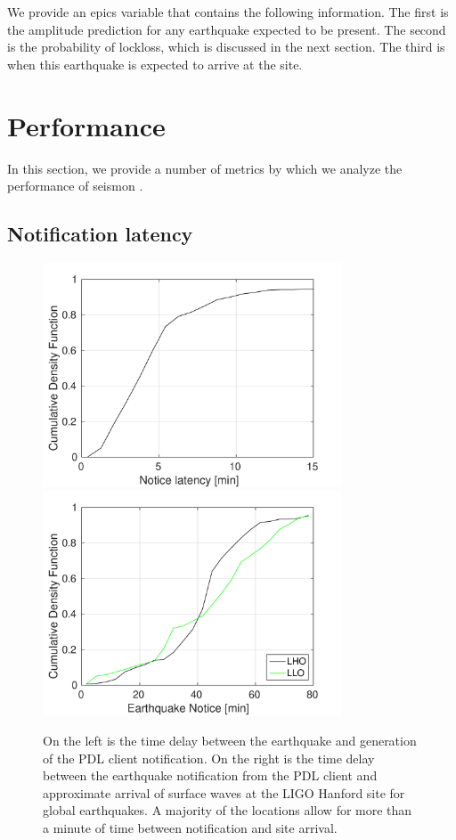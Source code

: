 \documentclass[reprint, prl, aps, showpacs]{revtex4-1}
\newcommand{\seismon}{\textnormal{seismon }}
\begin{document}
We provide an epics variable that contains the following information.
The first is the amplitude prediction for any earthquake expected to be present.
The second is the probability of lockloss, which is discussed in the next section.
The third is when this earthquake is expected to arrive at the site.
		

\section{Performance}
\label{sec:performance}

In this section, we provide a number of metrics by which we analyze the performance of \seismon.

\subsection{Notification latency}

\begin{figure}[t]
\hspace*{-0.5cm}
 \includegraphics[width=3.5in]{earthquake_notice.pdf}
 \includegraphics[width=3.5in]{lockloss_notice.pdf}
 \caption{On the left is the time delay between the earthquake and generation of the PDL client notification. On the right is the time delay between the earthquake notification from the PDL client and approximate arrival of surface waves at the LIGO Hanford site for global earthquakes. A majority of the locations allow for more than a minute of time between notification and site arrival.}
 \label{fig:delays}
\end{figure}
\end{document}
